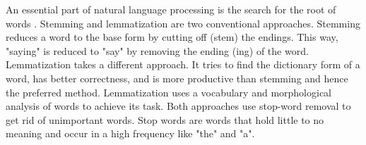 An essential part of natural language processing is the search for the root of words \cite{buiildChatbotsPython}. 
Stemming and lemmatization are two conventional approaches.
Stemming reduces a word to the base form by cutting off (stem) the endings. 
This way, "saying" is reduced to "say" by removing the ending (ing) of the word.
Lemmatization takes a different approach. 
It tries to find the dictionary form of a word, has better correctness, and is more productive than stemming and hence the preferred method. 
 Lemmatization uses a vocabulary and morphological analysis of words to achieve its task.
Both approaches use stop-word removal to get rid of unimportant words.
Stop words are words that hold little to no meaning and occur in a high frequency like "the" and "a".
